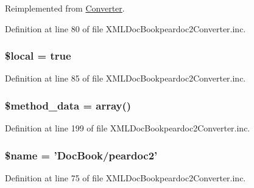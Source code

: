 \-Reimplemented from \hyperlink{class_converter_ab49669c749559bb7833762878adb8f0c}{\-Converter}.



\-Definition at line 80 of file \-X\-M\-L\-Doc\-Bookpeardoc2\-Converter.\-inc.

\hypertarget{class_x_m_l_doc_bookpeardoc2_converter_a6d3acd7bb365291cea0fc4b71fe5682a}{
\subsubsection[{\$local}]{\setlength{\rightskip}{0pt plus 5cm}\$local = true}}\label{class_x_m_l_doc_bookpeardoc2_converter_a6d3acd7bb365291cea0fc4b71fe5682a}


\-Definition at line 85 of file \-X\-M\-L\-Doc\-Bookpeardoc2\-Converter.\-inc.

\hypertarget{class_x_m_l_doc_bookpeardoc2_converter_a6ce6f073a68c637ae7f1eee6fd484090}{
\subsubsection[{\$method\-\_\-data}]{\setlength{\rightskip}{0pt plus 5cm}\$method\-\_\-data = array()}}\label{class_x_m_l_doc_bookpeardoc2_converter_a6ce6f073a68c637ae7f1eee6fd484090}


\-Definition at line 199 of file \-X\-M\-L\-Doc\-Bookpeardoc2\-Converter.\-inc.

\hypertarget{class_x_m_l_doc_bookpeardoc2_converter_ab2fc40d43824ea3e1ce5d86dee0d763b}{
\subsubsection[{\$name}]{\setlength{\rightskip}{0pt plus 5cm}\$name = '\-Doc\-Book/peardoc2'}}\label{class_x_m_l_doc_bookpeardoc2_converter_ab2fc40d43824ea3e1ce5d86dee0d763b}


\-Definition at line 75 of file \-X\-M\-L\-Doc\-Bookpeardoc2\-Converter.\-inc.


